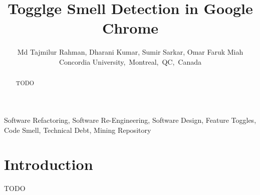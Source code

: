 \documentclass[conference]{IEEEtran}
\begin{document}
\title{Togglge Smell Detection in Google Chrome}
\author{
Md Tajmilur Rahman, Dharani Kumar, Sumir Sarkar, Omar Faruk Miah\\
Concordia University,~Montreal,~QC,~Canada
}
\maketitle

\begin{abstract}
TODO
\end{abstract}

\begin{IEEEkeywords}
Software Refactoring, Software Re-Engineering, Software Design, Feature Toggles, Code Smell, Technical Debt, Mining Repository
\end{IEEEkeywords}

\section{Introduction}
TODO
\end{document}
